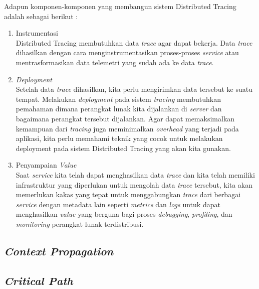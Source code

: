 Adapun komponen-komponen yang membangun sistem Distributed Tracing adalah sebagai berikut \citep{parker2020distributed}:
\begin{enumerate}
      \item Instrumentasi \\
            Distributed Tracing membutuhkan data \textit{trace} agar dapat bekerja.
            Data \textit{trace} dihasilkan dengan cara menginstrumentasikan proses-proses \textit{service} atau mentrasformasikan data telemetri yang sudah ada ke data \textit{trace}.
      \item \textit{Deployment} \\
            Setelah data \textit{trace} dihasilkan, kita perlu mengirimkan data tersebut ke suatu tempat.
            Melakukan \textit{deployment} pada sistem \textit{tracing} membutuhkan pemahaman dimana perangkat lunak kita dijalankan di \textit{server} dan bagaimana perangkat tersebut dijalankan.
            Agar dapat memaksimalkan kemampuan dari \textit{tracing} juga meminimalkan \textit{overhead} yang terjadi pada aplikasi, kita perlu memahami teknik yang cocok untuk melakukan deployment pada sistem Distributed Tracing yang akan kita gunakan.
      \item Penyampaian \textit{Value} \\
            Saat \textit{service} kita telah dapat menghasilkan data \textit{trace} dan kita telah memiliki infrastruktur yang diperlukan untuk mengolah data \textit{trace} tersebut, kita akan memerlukan kakas yang tepat untuk menggabungkan \textit{trace} dari berbagai \textit{service} dengan metadata lain seperti \textit{metrics} dan \textit{logs} untuk dapat menghasilkan \textit{value} yang berguna bagi proses \textit{debugging}, \textit{profiling}, dan \textit{monitoring} perangkat lunak terdistribusi.
\end{enumerate}

\subsection{\textit{Context Propagation}}

\subsection{\textit{Critical Path}}
\label{crit-path}

%
%
%



